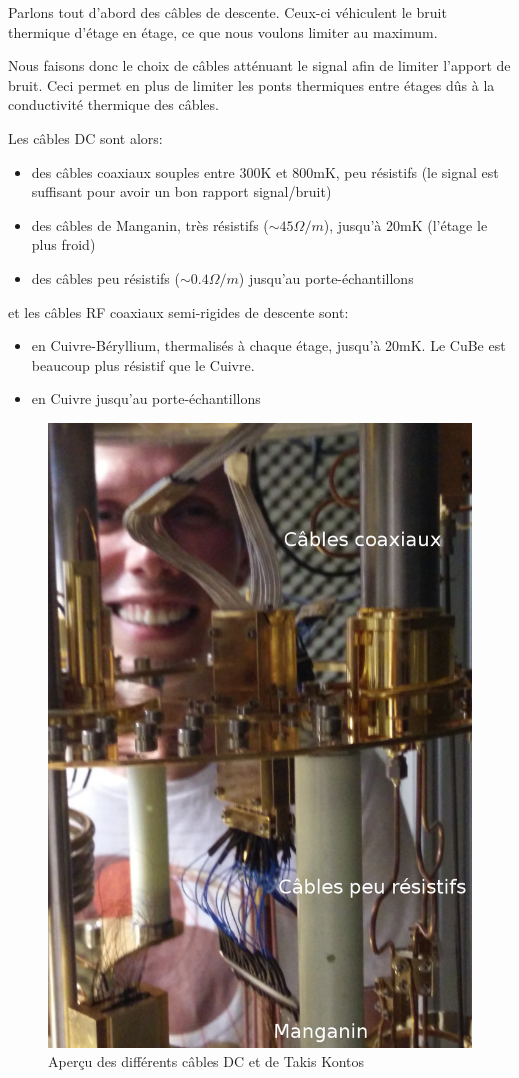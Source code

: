 Parlons tout d'abord des câbles de descente. Ceux-ci véhiculent le bruit thermique d'étage en étage, ce que nous voulons limiter au maximum.

Nous faisons donc le choix de câbles atténuant le signal afin de limiter l'apport de bruit. Ceci permet en plus de limiter les ponts thermiques entre étages dûs à la conductivité thermique des câbles.
\newline

Les câbles DC sont alors:
\begin{itemize}
    \item des câbles coaxiaux souples entre 300K et 800mK, peu résistifs (le signal est suffisant pour avoir un bon rapport signal/bruit)
    \item des câbles de Manganin, très résistifs ($\sim45\Omega/m$), jusqu'à 20mK (l'étage le plus froid)
    \item des câbles peu résistifs ($\sim0.4\Omega/m$) jusqu'au porte-échantillons
    \newline
\end{itemize}

et les câbles RF coaxiaux semi-rigides de descente sont:
\begin{itemize}
    \item en Cuivre-Béryllium, thermalisés à chaque étage, jusqu'à 20mK. Le CuBe est beaucoup plus résistif que le Cuivre.
    \item en Cuivre jusqu'au porte-échantillons
\end{itemize}

\begin{figure}[h]
    \begin{center}
        \includegraphics[height=0.75\textwidth]{Images/Thermalisation/Etage_Tuteur}
        \caption{Aperçu des différents câbles DC et de Takis Kontos}
        \label{fig:}
    \end{center}
\end{figure}

